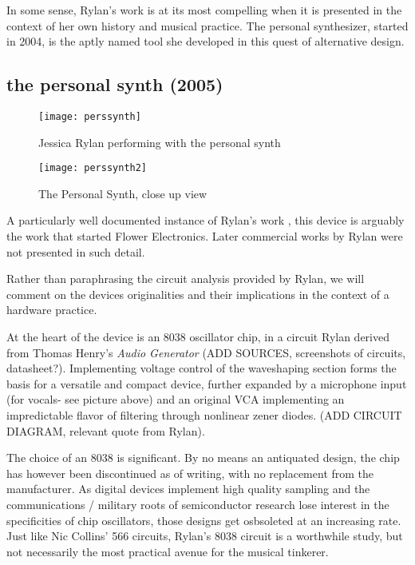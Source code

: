 In some sense, Rylan's work is at its most compelling when it is presented in the context of her own history and musical practice. The personal synthesizer, started in 2004, is the aptly named tool she developed in this quest of alternative design. 

\subsection{the personal synth (2005)}

	\begin{figure}[h!]
	  \caption{Jessica Rylan performing with the personal synth}
	  \centering
	    \texttt{[image: perssynth]}
	\end{figure}
	
	\begin{figure}[h!]
	  \caption{The Personal Synth, close up view}
	  \centering
	    \texttt{[image: perssynth2]}
	\end{figure}
	
	A particularly well documented instance of Rylan's work \citep{rylan2011}, this device is arguably the work that started Flower Electronics. Later commercial works by Rylan were not presented in such detail. 
	
	Rather than paraphrasing the circuit analysis provided by Rylan, we will comment on the devices originalities and their implications in the context of a hardware practice. 
	
	At the heart of the device is an 8038 oscillator chip, in a circuit Rylan derived from Thomas Henry's \emph{Audio Generator} (ADD SOURCES, screenshots of circuits, datasheet?). Implementing voltage control of the waveshaping section forms the basis for a versatile and compact device, further expanded by a microphone input (for vocals- see picture above) and an original VCA implementing an impredictable flavor of filtering through nonlinear zener diodes. (ADD CIRCUIT DIAGRAM, relevant quote from Rylan). 
	
	The choice of an 8038 is significant. By no means an antiquated design, the chip has however been discontinued as of writing, with no replacement from the manufacturer. As digital devices implement high quality sampling and the communications / military roots of semiconductor research lose interest in the specificities of chip oscillators, those designs get osbsoleted at an increasing rate. Just like Nic Collins' 566 circuits, Rylan's 8038 circuit is a worthwhile study, but not necessarily the most practical avenue for the musical tinkerer. 
	
